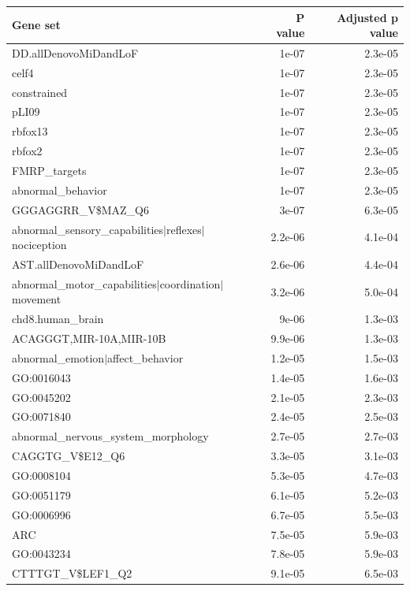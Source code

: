 \documentclass[]{article}
\begin{document}


\begin{longtable}{|l|r|r|}

\hline
Gene set & P value & Adjusted p value \\
\hline
\endhead

 DD.allDenovoMiDandLoF  &  1e-07  &  2.3e-05 \\
celf4  &  1e-07  &  2.3e-05 \\
constrained  &  1e-07  &  2.3e-05 \\
pLI09  &  1e-07  &  2.3e-05 \\
rbfox13  &  1e-07  &  2.3e-05 \\
rbfox2  &  1e-07  &  2.3e-05 \\
FMRP\_targets  &  1e-07  &  2.3e-05 \\
abnormal\_behavior  &  1e-07  &  2.3e-05 \\
GGGAGGRR\_V\$MAZ\_Q6  &  3e-07  &  6.3e-05 \\
abnormal\_sensory\_capabilities$|$reflexes$|$nociception  &  2.2e-06  &  4.1e-04 \\
AST.allDenovoMiDandLoF  &  2.6e-06  &  4.4e-04 \\
abnormal\_motor\_capabilities$|$coordination$|$movement  &  3.2e-06  &  5.0e-04 \\
chd8.human\_brain  &  9e-06  &  1.3e-03 \\
ACAGGGT,MIR-10A,MIR-10B  &  9.9e-06  &  1.3e-03 \\
abnormal\_emotion$|$affect\_behavior  &  1.2e-05  &  1.5e-03 \\
GO:0016043  &  1.4e-05  &  1.6e-03 \\
GO:0045202  &  2.1e-05  &  2.3e-03 \\
GO:0071840  &  2.4e-05  &  2.5e-03 \\
abnormal\_nervous\_system\_morphology  &  2.7e-05  &  2.7e-03 \\
CAGGTG\_V\$E12\_Q6  &  3.3e-05  &  3.1e-03 \\
GO:0008104  &  5.3e-05  &  4.7e-03 \\
GO:0051179  &  6.1e-05  &  5.2e-03 \\
GO:0006996  &  6.7e-05  &  5.5e-03 \\
ARC  &  7.5e-05  &  5.9e-03 \\
GO:0043234  &  7.8e-05  &  5.9e-03 \\
CTTTGT\_V\$LEF1\_Q2  &  9.1e-05  &  6.5e-03 \\

\end{longtable}
\end{document}
